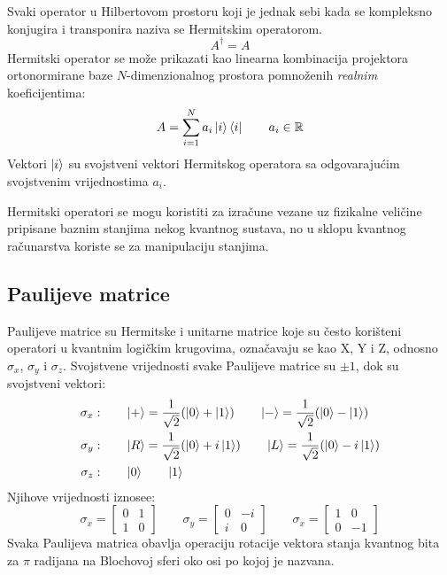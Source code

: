 Svaki operator u Hilbertovom prostoru koji je jednak sebi kada se kompleksno konjugira i transponira naziva se Hermitskim operatorom.
\begin{equation}
A^\dagger = A
\end{equation}
Hermitski operator se može prikazati kao linearna kombinacija projektora ortonormirane baze $N$-dimenzionalnog prostora pomnoženih \emph{realnim} koeficijentima:
\begin{equation}
A = \sum_{i = 1}^N a_i\ket{i}\bra{i}
\qquad
a_i \in \mathbb{R}
\end{equation}
Vektori $\ket{i}$ su svojstveni vektori Hermitskog operatora sa odgovarajućim svojstvenim vrijednostima $a_i$.

Hermitski operatori se mogu koristiti za izračune vezane uz fizikalne veličine pripisane baznim stanjima nekog kvantnog sustava, no u sklopu kvantnog računarstva koriste se za manipulaciju stanjima.

\subsection{Paulijeve matrice}

Paulijeve matrice su Hermitske i unitarne matrice koje su često korišteni operatori u kvantnim logičkim krugovima, označavaju se kao X, Y i Z, odnosno $\sigma_x$, $\sigma_y$ i $\sigma_z$. Svojstvene vrijednosti svake Paulijeve matrice su $\pm 1$, dok su svojstveni vektori:
\begin{align}
\sigma_x:&
\qquad
\ket{+} = \frac{1}{\sqrt{2}}(\ket{0} + \ket{1})
\qquad
\ket{-} = \frac{1}{\sqrt{2}}(\ket{0} - \ket{1})
\\
\sigma_y:&
\qquad
\ket{R} = \frac{1}{\sqrt{2}}(\ket{0} + i\ket{1})
\qquad
\ket{L} = \frac{1}{\sqrt{2}}(\ket{0} - i\ket{1})
\\
\sigma_z:&
\qquad
\ket{0}
\qquad
\ket{1}
\end{align}
Njihove vrijednosti iznosee:
\begin{equation}
\sigma_x = \begin{bmatrix}
0 & 1 \\ 1 & 0
\end{bmatrix}
\qquad
\sigma_y = \begin{bmatrix}
0 & -i \\ i & 0
\end{bmatrix}
\qquad
\sigma_x = \begin{bmatrix}
1 & 0 \\ 0 & -1
\end{bmatrix}
\end{equation}
Svaka Paulijeva matrica obavlja operaciju rotacije vektora stanja kvantnog bita za $\pi$ radijana na Blochovoj sferi oko osi po kojoj je nazvana.

